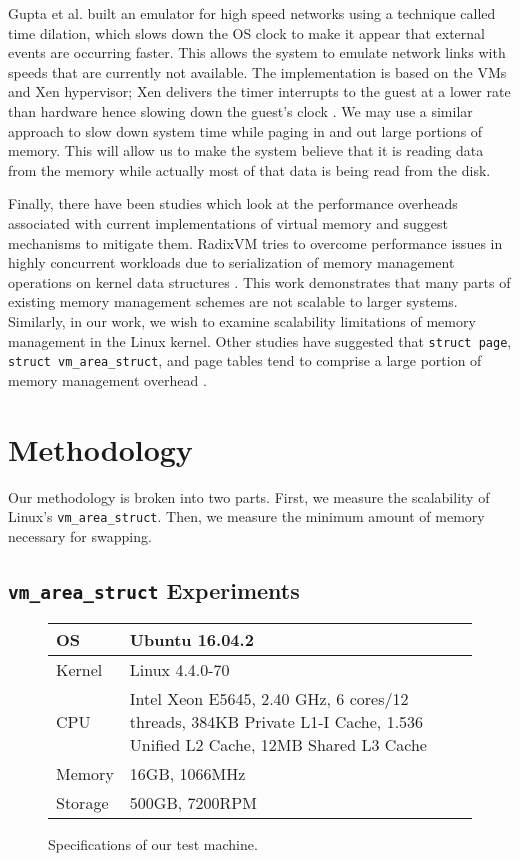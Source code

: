 \documentclass[twocolumn,11pt]{article}
\begin{document}
Gupta et al. built an emulator for high speed networks using a technique called
time dilation, which slows down the OS clock to make it appear that external
events are occurring faster. This allows the system to emulate network links
with speeds that are currently not available. The implementation is based on the
VMs and Xen hypervisor; Xen delivers the timer interrupts to the guest at a
lower rate than hardware hence  slowing down the guest’s clock \cite{timedil}.
We may use a similar approach to slow down system time  while paging in and out
large portions of memory. This will allow us to make the system believe that it
is reading data from the memory while actually most of that data is being read
from the disk.

Finally, there have been studies which look at the performance overheads
associated with current implementations of virtual memory and suggest mechanisms
to mitigate them. RadixVM tries to overcome performance issues in highly
concurrent workloads due to serialization of memory management operations on
kernel data structures \cite{radixvm}. This work demonstrates that many parts of
existing memory management schemes are not scalable to larger systems.
Similarly, in our work, we wish to examine scalability limitations of memory
management in the Linux kernel. Other studies have suggested that \texttt{struct
page}, \texttt{struct vm\_area\_struct}, and page tables tend to comprise a
large portion of memory management overhead \cite{simics}.

\section{Methodology}

Our methodology is broken into two parts. First, we measure the scalability of
Linux's \texttt{vm\_area\_struct}. Then, we measure the minimum amount of memory
necessary for swapping.

\subsection{\texttt{vm\_area\_struct} Experiments}

\begin{figure}
\centering
\begin{tabular}{|l|p{5cm}|} \hline
OS & Ubuntu 16.04.2 \\ \hline
Kernel & Linux 4.4.0-70 \\ \hline
CPU & Intel Xeon E5645, 2.40 GHz, 6 cores/12 threads, 384KB Private L1-I Cache,
1.536 Unified L2 Cache, 12MB Shared L3 Cache \\ \hline
Memory & 16GB, 1066MHz \\ \hline
Storage & 500GB, 7200RPM \\
\hline
\end{tabular}
\caption{Specifications of our test machine.  \label{fig:specs}}
\end{figure}
\end{document}
